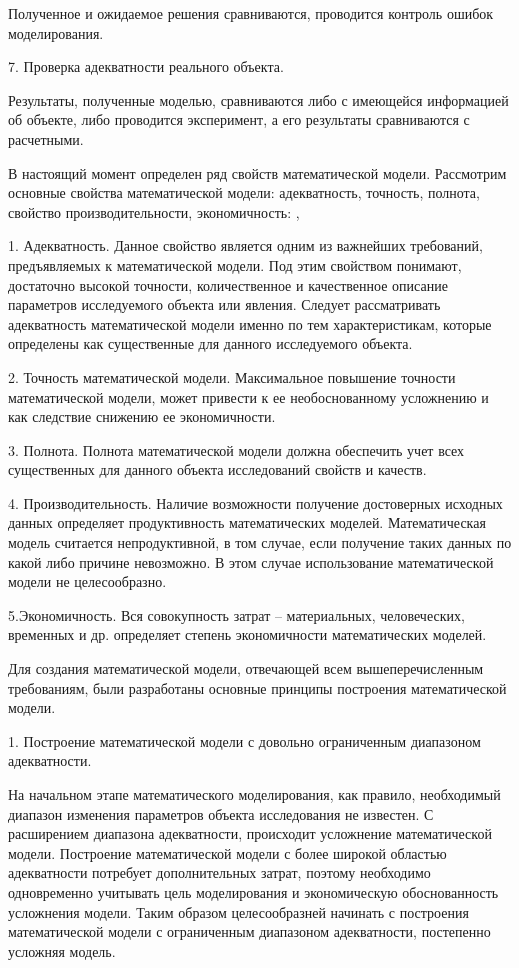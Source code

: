 Полученное и ожидаемое решения сравниваются, проводится контроль ошибок моделирования.


7. Проверка адекватности реального объекта.


Результаты, полученные моделью, сравниваются либо с имеющейся информацией об объекте, либо проводится эксперимент, а его результаты сравниваются с расчетными.\cite{b3}


В настоящий момент определен ряд свойств математической модели. Рассмотрим основные свойства математической модели: адекватность, точность, полнота, свойство производительности, экономичность: \cite{b1}, \cite{b3}
 
1.	Адекватность. Данное  свойство является одним из важнейших требований, предъявляемых к математической модели. Под этим свойством понимают, достаточно высокой точности, количественное  и качественное описание параметров исследуемого объекта или явления. Следует рассматривать адекватность математической модели именно по тем характеристикам, которые определены как существенные для данного исследуемого объекта. 


2.	Точность математической модели. Максимальное повышение точности математической модели, может привести к ее необоснованному усложнению и как следствие снижению ее экономичности.


3.	Полнота. Полнота математической модели должна обеспечить учет всех существенных для данного объекта исследований свойств и качеств. 


4. Производительность. Наличие возможности получение достоверных исходных данных  определяет продуктивность математических моделей. Математическая модель считается непродуктивной, в том случае, если получение таких данных по какой либо причине невозможно. В этом случае использование математической модели не целесообразно.

5.Экономичность. Вся совокупность затрат – материальных, человеческих, временных и др. определяет степень экономичности математических моделей.


Для создания математической модели, отвечающей всем вышеперечисленным требованиям, были разработаны основные принципы построения математической модели.


1.	Построение математической модели с довольно ограниченным диапазоном адекватности. 


На начальном этапе математического моделирования, как правило, необходимый диапазон изменения параметров объекта исследования не известен. С расширением диапазона адекватности, происходит усложнение математической модели. Построение математической модели с более широкой областью адекватности потребует дополнительных затрат, поэтому необходимо одновременно учитывать цель моделирования и экономическую обоснованность усложнения модели. Таким образом целесообразней начинать с построения математической модели с ограниченным диапазоном адекватности, постепенно усложняя модель.


